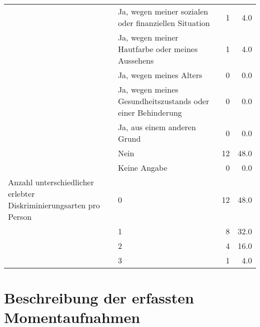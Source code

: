 \begin{appendices}
\begin{longtable}{p{5.5cm}p{5.5cm}rr}
     & Ja, wegen meiner sozialen oder finanziellen Situation & 1 & 4.0 \\*
     & Ja, wegen meiner Hautfarbe oder meines Aussehens & 1 & 4.0 \\*
     & Ja, wegen meines Alters & 0 & 0.0 \\*
     & Ja, wegen meines Gesundheitszustands oder einer Behinderung & 0 & 0.0 \\*
     & Ja, aus einem anderen Grund & 0 & 0.0 \\*
     & Nein & 12 & 48.0 \\*
     & Keine Angabe & 0 & 0.0 \\
     \midrule
    \addlinespace
    Anzahl unterschiedlicher erlebter Diskriminierungsarten pro Person & 0 & 12 & 48.0 \\*
     & 1 & 8 & 32.0 \\*
     & 2 & 4 & 16.0 \\*
     & 3 & 1 & 4.0 \\
     \bottomrule
\end{longtable}
    
\section{Beschreibung der erfassten Momentaufnahmen}
\label{sec:appendix_moments}



\end{appendices}
